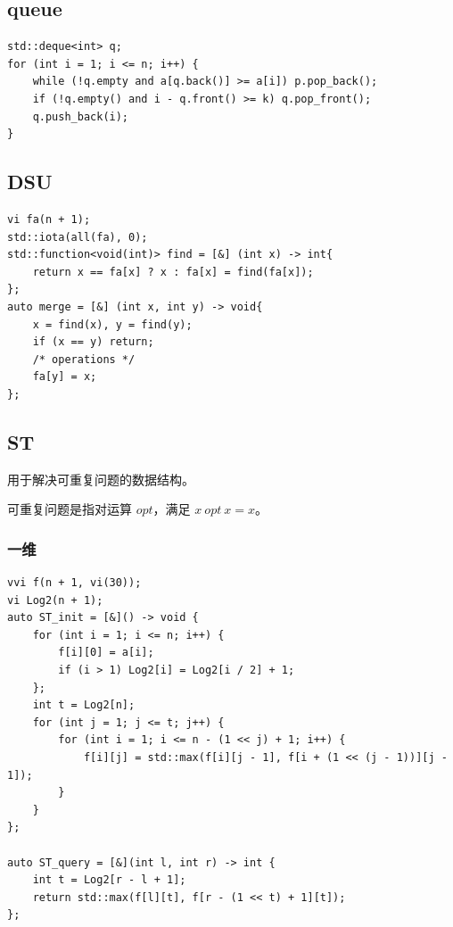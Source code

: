 \documentclass[UTF8, a4paper, titlepage, twoside]{ctexart}
\begin{document}
\subsection{ queue }
\begin{lstlisting}[style=cpp]
std::deque<int> q;
for (int i = 1; i <= n; i++) {    
    while (!q.empty and a[q.back()] >= a[i]) p.pop_back();
    if (!q.empty() and i - q.front() >= k) q.pop_front();
    q.push_back(i);
}
\end{lstlisting}

\subsection{ DSU }
\begin{lstlisting}[style=cpp]
vi fa(n + 1);
std::iota(all(fa), 0);
std::function<void(int)> find = [&] (int x) -> int{
    return x == fa[x] ? x : fa[x] = find(fa[x]);
};
auto merge = [&] (int x, int y) -> void{
    x = find(x), y = find(y);
    if (x == y) return;
    /* operations */
    fa[y] = x;
};
\end{lstlisting}

\subsection{ ST }

用于解决可重复问题的数据结构。

可重复问题是指对运算 $opt$，满足 $x \ opt \ x = x$。

\subsubsection*{ 一维 }
\begin{lstlisting}[style=cpp]
vvi f(n + 1, vi(30));
vi Log2(n + 1);
auto ST_init = [&]() -> void {
    for (int i = 1; i <= n; i++) {
        f[i][0] = a[i];
        if (i > 1) Log2[i] = Log2[i / 2] + 1;
    };
    int t = Log2[n];
    for (int j = 1; j <= t; j++) {
        for (int i = 1; i <= n - (1 << j) + 1; i++) {
            f[i][j] = std::max(f[i][j - 1], f[i + (1 << (j - 1))][j - 1]);
        }
    }
};

auto ST_query = [&](int l, int r) -> int {
    int t = Log2[r - l + 1];
    return std::max(f[l][t], f[r - (1 << t) + 1][t]);
};
\end{lstlisting}
\end{document}
